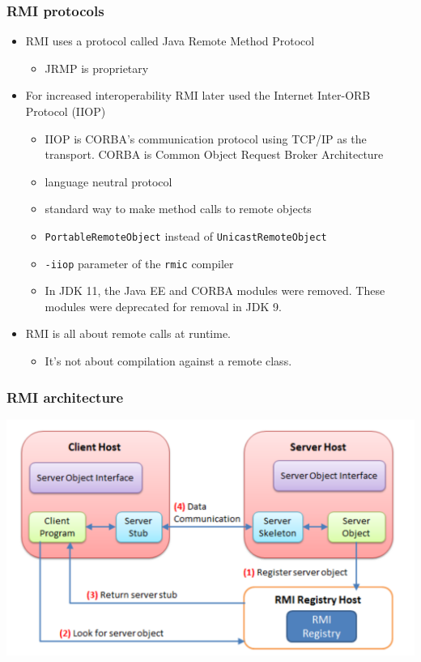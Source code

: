 \documentclass[10pt,xcolor=pdflatex]{beamer}
\begin{document}
\begin{frame}[containsverbatim]\frametitle{RMI protocols}
\begin{itemize}
	\item RMI uses a protocol called Java Remote Method Protocol
	  \begin{itemize}
		\item JRMP is proprietary
	  \end{itemize}
    \item For increased interoperability RMI later used the Internet Inter-ORB Protocol (IIOP)
	  \begin{itemize}
		\item IIOP is CORBA's communication protocol using TCP/IP as the transport. CORBA is Common Object Request Broker Architecture
		\item language neutral protocol
		\item standard way to make method calls to remote objects
		\item \texttt{PortableRemoteObject} instead of \texttt{UnicastRemoteObject}
		\item \texttt{-iiop} parameter of the \texttt{rmic} compiler
		\item In JDK 11, the Java EE and CORBA modules were removed. These modules were deprecated for removal in JDK 9.
	  \end{itemize}
    \item RMI is all about remote calls at runtime.
	  \begin{itemize}
		\item It’s not about compilation against a remote class.
	  \end{itemize}
\end{itemize}
\end{frame}


\begin{frame}[containsverbatim]\frametitle{RMI architecture}
\includegraphics[scale=0.41]{img/obr1}
\end{frame}
\end{document}
